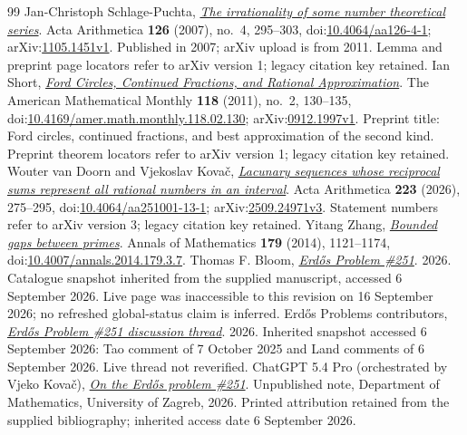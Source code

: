 \begin{thebibliography}{99}
 Jan-Christoph Schlage-Puchta, \href{https://arxiv.org/abs/1105.1451v1}{\emph{The irrationality of some number theoretical series}}.
  Acta Arithmetica \textbf{126} (2007), no.~4, 295--303, doi:\href{https://doi.org/10.4064/aa126-4-1}{10.4064/aa126-4-1}; arXiv:\href{https://arxiv.org/abs/1105.1451v1}{1105.1451v1}. Published in 2007; arXiv upload is from 2011. Lemma and preprint page locators refer to arXiv version 1; legacy citation key retained.
 Ian Short, \href{https://arxiv.org/abs/0912.1997v1}{\emph{Ford Circles, Continued Fractions, and Rational Approximation}}.
  The American Mathematical Monthly \textbf{118} (2011), no.~2, 130--135, doi:\href{https://doi.org/10.4169/amer.math.monthly.118.02.130}{10.4169/amer.math.monthly.118.02.130}; arXiv:\href{https://arxiv.org/abs/0912.1997v1}{0912.1997v1}. Preprint title: Ford circles, continued fractions, and best approximation of the second kind. Preprint theorem locators refer to arXiv version 1; legacy citation key retained.
 Wouter van Doorn and Vjekoslav Kova\v{c}, \href{https://arxiv.org/abs/2509.24971v3}{\emph{Lacunary sequences whose reciprocal sums represent all rational numbers in an interval}}.
  Acta Arithmetica \textbf{223} (2026), 275--295, doi:\href{https://doi.org/10.4064/aa251001-13-1}{10.4064/aa251001-13-1}; arXiv:\href{https://arxiv.org/abs/2509.24971v3}{2509.24971v3}. Statement numbers refer to arXiv version 3; legacy citation key retained.
 Yitang Zhang, \href{https://doi.org/10.4007/annals.2014.179.3.7}{\emph{Bounded gaps between primes}}.
  Annals of Mathematics \textbf{179} (2014), 1121--1174, doi:\href{https://doi.org/10.4007/annals.2014.179.3.7}{10.4007/annals.2014.179.3.7}.
 Thomas F. Bloom, \href{https://www.erdosproblems.com/251}{\emph{Erd\H{o}s Problem \#251}}.
  2026. Catalogue snapshot inherited from the supplied manuscript, accessed 6 September 2026. Live page was inaccessible to this revision on 16 September 2026; no refreshed global-status claim is inferred.
 {Erdős Problems contributors}, \href{https://www.erdosproblems.com/forum/thread/251}{\emph{Erd\H{o}s Problem \#251 discussion thread}}.
  2026. Inherited snapshot accessed 6 September 2026: Tao comment of 7 October 2025 and Land comments of 6 September 2026. Live thread not reverified.
 {ChatGPT 5.4 Pro (orchestrated by Vjeko Kova\v{c})}, \href{https://web.math.pmf.unizg.hr/~vjekovac/files/Erdos_problem_251.pdf}{\emph{On the Erd\H{o}s problem \#251}}.
  Unpublished note, Department of Mathematics, University of Zagreb, 2026. Printed attribution retained from the supplied bibliography; inherited access date 6 September 2026.

\end{thebibliography}
